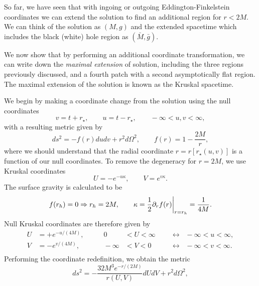 So far, we have seen that with ingoing or outgoing Eddington-Finkelstein coordinates we can extend the \sch solution to find an additional region for $r < 2M$. We can think of the \sch solution as $(M,g)$ and the extended spacetime which includes the black (white) hole region as $(\bar{M}, \bar{g})$.

We now show that by performing an additional coordinate transformation, we can write down the \emph{maximal extension} of \sch solution, including the three regions previously discussed, and a fourth patch with a second asymptotically flat region. The maximal extension of the \sch solution is known as the Kruskal spacetime.

We begin by making a coordinate change from the \sch solution using the null coordinates
\begin{equation*}
	v = t + r_\star, \qquad u = t - r_\star, \qquad - \infty < u,v < \infty,
\end{equation*}
with a resulting metric given by
\begin{equation}
\label{eq:null1}
	ds^2 = - f(r) du dv + r^2 d\Omega^2, \qquad f(r) = 1 - \frac{2M}{r},
\end{equation}
where we should understand that the radial coordinate $r = r[r_\star(u,v)]$ is a function of our null coordinates. To remove the degeneracy for $r = 2M$, we use Kruskal coordinates
\begin{equation*}
	U = - e^{-u \kappa}, \qquad V = e^{v \kappa}.
\end{equation*}
The surface gravity  is calculated to be
\begin{equation*}
	f(r_h) = 0 \Rightarrow r_h = 2M, \qquad \kappa = \frac{1}{2} \partial_r f(r) \bigg|_{r = r_h} = \frac{1}{4M}.
\end{equation*}
Null Kruskal coordinates are therefore given by
\begin{equation*}
\begin{aligned}
	U &= + e^{-u / (4M)}, & \qquad 0 &< U < \infty \;\; &&\leftrightarrow \;\; -\infty < u < \infty , \\ 
	V &= - e^{v / (4M)}, & \qquad -\infty &< V < 0 \;\;&&\leftrightarrow \;\; -\infty < v < \infty. \\ 
\end{aligned}
\end{equation*}
Performing the coordinate redefinition, we obtain the metric
\begin{equation}
\label{eq:krusmet}
	ds^2 = - \frac{32 M^3 e^{-r / (2M)}}{r(U,V)} dU dV + r^2 d\Omega^2,
\end{equation}
